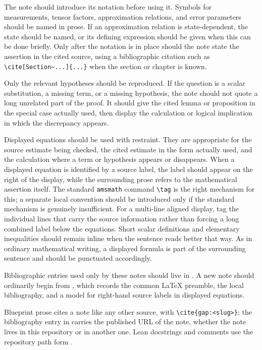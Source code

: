 \documentclass[11pt]{article}
\begin{document}
The note should introduce its notation before using it.  Symbols for
measurements, tensor factors, approximation relations, and error parameters
should be named in prose.  If an approximation relation is state-dependent, the
state should be named, or its defining expression should be given when this can
be done briefly.  Only after the notation is in place should the note state the
assertion in the cited source, using a bibliographic citation such as
\verb|\cite[Section~...]{...}| when the section or chapter is known.

Only the relevant hypotheses should be reproduced.  If the question is a scalar
substitution, a missing term, or a missing hypothesis, the note should not quote
a long unrelated part of the proof.  It should give the cited lemma or
proposition in the special case actually used, then display the calculation or
logical implication in which the discrepancy appears.

Displayed equations should be used with restraint.  They are appropriate for the
source estimate being checked, the cited estimate in the form actually used, and
the calculation where a term or hypothesis appears or disappears.  When a
displayed equation is identified by a source label, the label should appear on
the right of the display, while the surrounding prose refers to the mathematical
assertion itself.  The standard \texttt{amsmath} command \verb|\tag| is the
right mechanism for this; a separate local convention should be introduced only
if the standard mechanism is genuinely insufficient.  For a multi-line aligned
display, tag the individual lines that carry the source information rather than
forcing a long combined label below the equations.  Short
scalar definitions and elementary inequalities should remain inline when the
sentence reads better that way.  As in ordinary mathematical writing, a displayed
formula is part of the surrounding sentence and should be punctuated accordingly.

Bibliographic entries used only by these notes should live in
.  A new note should ordinarily begin from
, which records the common LaTeX preamble,
the local bibliography, and a model for right-hand source labels in displayed
equations.

Blueprint prose cites a note like any other source, with
\verb|\cite{gap:<slug>}|; the bibliography entry in
 carries the published URL of the note,
whether the note lives in this repository or in another one.  Lean docstrings
and comments use the repository path form .
\end{document}
